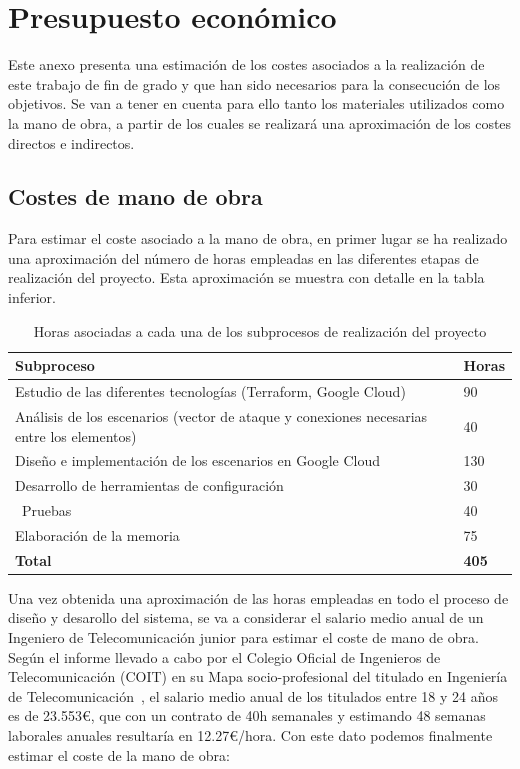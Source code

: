 \chapter{Presupuesto económico} \label{anx:ec}
  Este anexo presenta una estimación de los costes asociados a la realización de este trabajo de fin de grado y que han sido necesarios para la consecución de los objetivos. Se van a tener en cuenta para ello tanto los materiales utilizados como la mano de obra, a partir de los cuales se realizará una aproximación de los costes directos e indirectos. 

\section*{Costes de mano de obra}
  Para estimar el coste asociado a la mano de obra, en primer lugar se ha realizado una aproximación del número de horas empleadas en las diferentes etapas de realización del proyecto. Esta aproximación se muestra con detalle en la tabla inferior. 
  
  \begin{table}[h]
    \begin{center}
      \begin{tabular}{ | m{} | w{c}{1,5cm} | }
        \hline{} \centering\textbf{Subproceso} & \textbf{Horas} \\ \hline
        Estudio de las diferentes tecnologías (Terraform, Google Cloud) & 90 \\ \hline{}
        Análisis de los escenarios (vector de ataque y conexiones necesarias entre los elementos) & 40 \\ \hline
        Diseño e implementación de los escenarios en Google Cloud & 130 \\ \hline{}
        Desarrollo de herramientas de configuración & 30  \\ \hline\
        Pruebas & 40  \\ \hline{}
        Elaboración de la memoria & 75 \\ \hline{}
        \textbf{Total} & \textbf{405} \\ \hline
      \end{tabular}
      \caption{Horas asociadas a cada una de los subprocesos de realización del proyecto}
      \label{tab:hours}
    \end{center}
  \end{table}
  
  Una vez obtenida una aproximación de las horas empleadas en todo el proceso de diseño y desarollo del sistema, se va a considerar el salario medio anual de un Ingeniero de Telecomunicación junior para estimar el coste de mano de obra. Según el informe llevado a cabo por el Colegio Oficial de Ingenieros de Telecomunicación (COIT) en su Mapa socio-profesional del titulado en Ingeniería de Telecomunicación~\cite{anx1}, el salario medio anual de los titulados entre 18 y 24 años es de 23.553€, que con un contrato de 40h semanales y estimando 48 semanas laborales anuales resultaría en 12.27€/hora. Con este dato podemos finalmente estimar el coste de la mano de obra:

